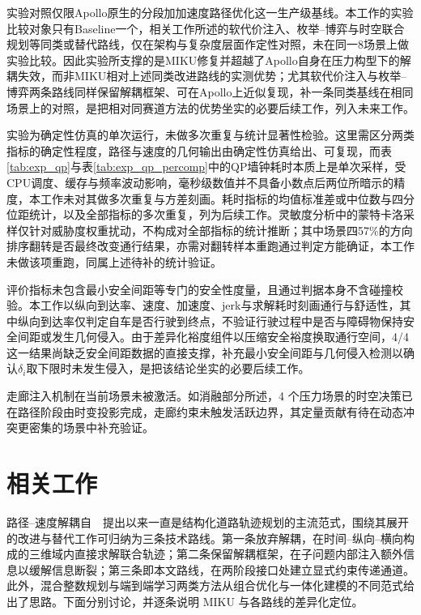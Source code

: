 \documentclass[a4paper,11pt]{ctexart}
\theoremstyle{definition}
\begin{document}
实验对照仅限Apollo原生的分段加加速度路径优化这一生产级基线。本工作的实验比较对象只有Baseline一个，相关工作所述的软代价注入、枚举--博弈与时空联合规划等同类或替代路线，仅在架构与复杂度层面作定性对照，未在同一8场景上做实验比较。因此实验所支撑的是MIKU修复并超越了Apollo自身在压力构型下的解耦失效，而非MIKU相对上述同类改进路线的实测优势；尤其软代价注入与枚举--博弈两条路线同样保留解耦框架、可在Apollo上近似复现，补一条同类基线在相同场景上的对照，是把相对同赛道方法的优势坐实的必要后续工作，列入未来工作。

实验为确定性仿真的单次运行，未做多次重复与统计显著性检验。这里需区分两类指标的确定性程度，路径与速度的几何输出由确定性仿真给出、可复现，而表\ref{tab:exp_qp}与表\ref{tab:exp_qp_percomp}中的QP墙钟耗时本质上是单次采样，受CPU调度、缓存与频率波动影响，毫秒级数值并不具备小数点后两位所暗示的精度，本工作未对其做多次重复与方差刻画。耗时指标的均值标准差或中位数与四分位距统计，以及全部指标的多次重复，列为后续工作。灵敏度分析中的蒙特卡洛采样仅针对威胁度权重扰动，不构成对全部指标的统计推断；其中场景四57\%的方向排序翻转是否最终改变通行结果，亦需对翻转样本重跑通过判定方能确证，本工作未做该项重跑，同属上述待补的统计验证。

评价指标未包含最小安全间距等专门的安全性度量，且通过判据本身不含碰撞校验。本工作以纵向到达率、速度、加速度、jerk与求解耗时刻画通行与舒适性，其中纵向到达率仅判定自车是否行驶到终点，不验证行驶过程中是否与障碍物保持安全间距或发生几何侵入。由于差异化裕度组件以压缩安全裕度换取通行空间，4/4 这一结果尚缺乏安全间距数据的直接支撑，补充最小安全间距与几何侵入检测以确认$\delta_i$取下限时未发生侵入，是把该结论坐实的必要后续工作。

走廊注入机制在当前场景未被激活。如消融部分所述，4 个压力场景的时空决策已在路径阶段由时变投影完成，走廊约束未触发活跃边界，其定量贡献有待在动态冲突更密集的场景中补充验证。

\section{相关工作}
\label{sec:related}

路径--速度解耦自~\citet{kant1986pvd}~提出以来一直是结构化道路轨迹规划的主流范式，围绕其展开的改进与替代工作可归纳为三条技术路线。第一条放弃解耦，在时间--纵向--横向构成的三维域内直接求解联合轨迹；第二条保留解耦框架，在子问题内部注入额外信息以缓解信息断裂；第三条即本文路线，在两阶段接口处建立显式约束传递通道。此外，混合整数规划与端到端学习两类方法从组合优化与一体化建模的不同范式给出了思路。下面分别讨论，并逐条说明 MIKU 与各路线的差异化定位。
\end{document}
